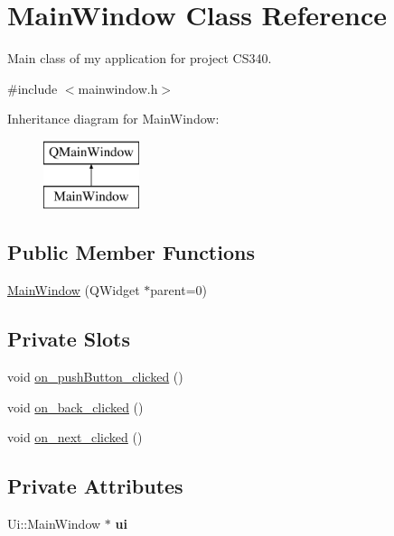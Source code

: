 \hypertarget{class_main_window}{\section{Main\-Window Class Reference}
\label{class_main_window}
}


Main class of my application for project C\-S340.  




{\ttfamily \#include $<$mainwindow.\-h$>$}

Inheritance diagram for Main\-Window\-:\begin{figure}[H]
\begin{center}
\leavevmode
\includegraphics[height=2.000000cm]{class_main_window}
\end{center}
\end{figure}
\subsection*{Public Member Functions}
\begin{DoxyCompactItemize}
\item 
\hyperlink{class_main_window_a8b244be8b7b7db1b08de2a2acb9409db}{Main\-Window} (Q\-Widget $\ast$parent=0)
\end{DoxyCompactItemize}
\subsection*{Private Slots}
\begin{DoxyCompactItemize}
\item 
void \hyperlink{class_main_window_a4de79c63c7fa0b8d7c468ac71f20be81}{on\-\_\-push\-Button\-\_\-clicked} ()
\item 
void \hyperlink{class_main_window_ab15ff7efebd5191c823c99a239f86419}{on\-\_\-back\-\_\-clicked} ()
\item 
void \hyperlink{class_main_window_a7cef67e31c2c705d74a3b84772217825}{on\-\_\-next\-\_\-clicked} ()
\end{DoxyCompactItemize}
\subsection*{Private Attributes}
\begin{DoxyCompactItemize}
\item 
\hypertarget{class_main_window_a35466a70ed47252a0191168126a352a5}{Ui\-::\-Main\-Window $\ast$ {\bfseries ui}}\label{class_main_window_a35466a70ed47252a0191168126a352a5}

\end{DoxyCompactItemize}


